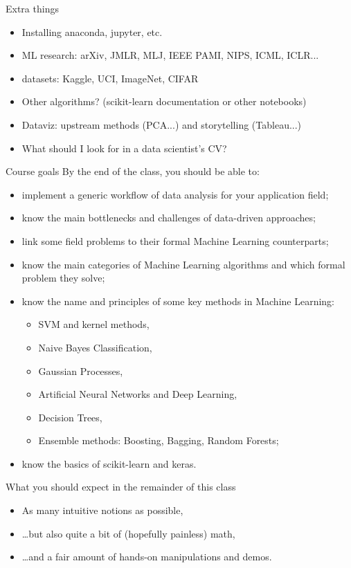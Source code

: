 \documentclass{beamer}
\begin{document}
\begin{frame}{Extra things}
\begin{itemize}
\item Installing anaconda, jupyter, etc.
\item ML research: arXiv, JMLR, MLJ, IEEE PAMI, NIPS, ICML, ICLR...
\item datasets: Kaggle, UCI, ImageNet, CIFAR
\item Other algorithms? (scikit-learn documentation or other notebooks)
\item Dataviz: upstream methods (PCA...) and storytelling (Tableau...)
\item What should I look for in a data scientist's CV?
\end{itemize}
\end{frame}

\begin{frame}{Course goals}
\small
By the end of the class, you should be able to:
\begin{itemize}
\item implement a generic workflow of data analysis for your application field;
\item know the main bottlenecks and challenges of data-driven approaches;
\item link some field problems to their formal Machine Learning counterparts;
\item know the main categories of Machine Learning algorithms and which formal problem they solve;
\item know the name and principles of some key methods in Machine Learning:
\begin{itemize}
\item SVM and kernel methods,
\item Naive Bayes Classification,
\item Gaussian Processes,
\item Artificial Neural Networks and Deep Learning,
\item Decision Trees,
\item Ensemble methods: Boosting, Bagging, Random Forests;
\end{itemize} 
\item know the basics of scikit-learn and keras.
\end{itemize}
\end{frame}

\begin{frame}{What you should expect in the remainder of this class}
\begin{itemize}
\item As many intuitive notions as possible,
\item \ldots but also quite a bit of (hopefully painless) math,\\
\item \ldots and a fair amount of hands-on manipulations and demos.
\end{itemize}
\end{frame}
\end{document}
